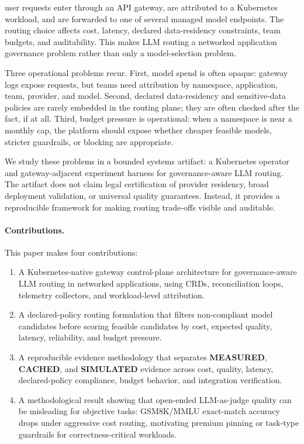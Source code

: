 \documentclass[10pt,journal,compsoc]{IEEEtran}
\begin{document}
user requests enter through an API gateway, are attributed to a Kubernetes
workload, and are forwarded to one of several managed model endpoints. The
routing choice affects cost, latency, declared data-residency constraints, team
budgets, and auditability. This makes LLM routing a networked application
governance problem rather than only a model-selection problem.

Three operational problems recur. First, model spend is often opaque: gateway
logs expose requests, but teams need attribution by namespace, application,
team, provider, and model. Second, declared data-residency and sensitive-data
policies are rarely embedded in the routing plane; they are often checked after
the fact, if at all. Third, budget pressure is operational: when a namespace is
near a monthly cap, the platform should expose whether cheaper feasible models,
stricter guardrails, or blocking are appropriate.

We study these problems in a bounded systems artifact: a Kubernetes operator and
gateway-adjacent experiment harness for governance-aware LLM routing. The
artifact does not claim legal certification of provider residency, broad
deployment validation, or universal quality guarantees. Instead, it provides a
reproducible framework for making routing trade-offs visible and auditable.

\paragraph{Contributions.}
This paper makes four contributions:
\begin{enumerate}
  \item A Kubernetes-native gateway control-plane architecture for
        governance-aware LLM routing in networked applications, using CRDs,
        reconciliation loops, telemetry collectors, and workload-level
        attribution.
  \item A declared-policy routing formulation that filters non-compliant model
        candidates before scoring feasible candidates by cost, expected quality,
        latency, reliability, and budget pressure.
  \item A reproducible evidence methodology that separates \textbf{MEASURED},
        \textbf{CACHED}, and \textbf{SIMULATED} evidence across cost, quality,
        latency, declared-policy compliance, budget behavior, and integration
        verification.
  \item A methodological result showing that open-ended LLM-as-judge quality can
        be misleading for objective tasks: GSM8K/MMLU exact-match accuracy drops
        under aggressive cost routing, motivating premium pinning or task-type
        guardrails for correctness-critical workloads.
\end{enumerate}
\end{document}
